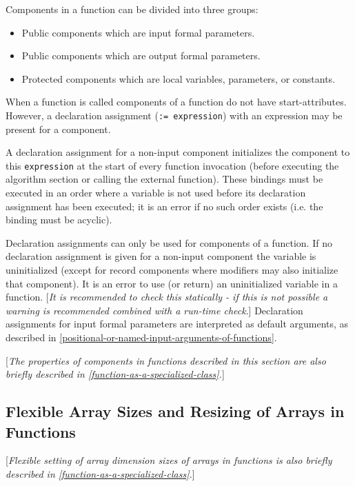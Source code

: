 Components in a function can be divided into three groups:

\begin{itemize}
\item
  Public components which are input formal parameters.
\item
  Public components which are output formal parameters.
\item
  Protected components which are local variables, parameters, or
  constants.
\end{itemize}

When a function is called components of a function do not have
start-attributes. However, a declaration assignment (\lstinline!:= expression!) with
an expression may be present for a component.

A declaration assignment for a non-input component initializes the
component to this \lstinline!expression! at the start of every function invocation
(before executing the algorithm section or calling the external
function). These bindings must be executed in an order where a variable
is not used before its declaration assignment has been executed; it is
an error if no such order exists (i.e. the binding must be acyclic).

Declaration assignments can only be used for components of a function.
If no declaration assignment is given for a non-input component the
variable is uninitialized (except for record components where modifiers
may also initialize that component). It is an error to use (or return)
an uninitialized variable in a function. {[}\emph{It is recommended to
check this statically - if this is not possible a warning is recommended
combined with a run-time check}.{]} Declaration assignments for input
formal parameters are interpreted as default arguments, as described in
\autoref{positional-or-named-input-arguments-of-functions}.

{[}\emph{The properties of components in functions described in this
section are also briefly described in \autoref{function-as-a-specialized-class}.}{]}

\subsection{Flexible Array Sizes and Resizing of Arrays in Functions}

{[}\emph{Flexible setting of array dimension sizes of arrays in
functions is also briefly described in \autoref{function-as-a-specialized-class}.}{]}

